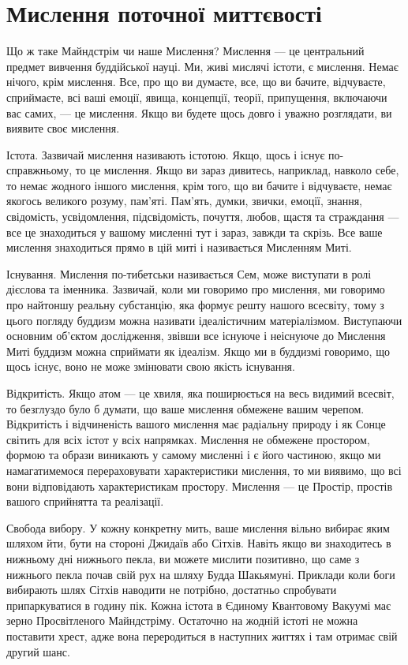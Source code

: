 \section{Мислення поточної миттєвості}

Що ж таке Майндстрім чи наше Мислення? Мислення --- це центральний предмет
вивчення буддійської науці. Ми, живі мислячі істоти, є мислення. Немає нічого,
крім мислення. Все, про що ви думаєте, все, що ви бачите, відчуваєте, сприймаєте,
всі ваші емоції, явища, концепції, теорії, припущення, включаючи вас самих, --- це мислення.
Якщо ви будете щось довго і уважно розглядати, ви виявите своє мислення.

Істота. Зазвичай мислення називають істотою. Якщо, щось і існує по-справжньому, то це мислення.
Якщо ви зараз дивитесь, наприклад, навколо себе, то немає жодного іншого мислення,
крім того, що ви бачите і відчуваєте, немає якогось великого розуму, пам'яті.
Пам'ять, думки, звички, емоції, знання, свідомість, усвідомлення, підсвідомість, почуття,
любов, щастя та страждання --- все це знаходиться у вашому мисленні тут і зараз, завжди та скрізь.
Все ваше мислення знаходиться прямо в цій миті і називається Мисленням Миті.

Існування. Мислення по-тибетськи називається Сем, може виступати в ролі дієслова
та іменника. Зазвичай, коли ми говоримо про мислення, ми говоримо про найтоншу
реальну субстанцію, яка формує решту нашого всесвіту, тому з цього погляду буддизм
можна називати ідеалістичним матеріалізмом. Виступаючи основним об'єктом дослідження,
звівши все існуюче і неіснуюче до Мислення Миті буддизм можна сприймати як ідеалізм.
Якщо ми в буддизмі говоримо, що щось існує, воно не може змінювати свою якість існування.

Відкритість. Якщо атом --- це хвиля, яка поширюється на весь видимий всесвіт,
то безглуздо було б думати, що ваше мислення обмежене вашим черепом. Відкритість і відчиненість
вашого мислення має радіальну природу і як Сонце світить для всіх істот у всіх напрямках.
Мислення не обмежене простором, формою та образи виникають у самому мисленні і є його частиною,
якщо ми намагатимемося перераховувати характеристики мислення, то ми виявимо, що всі вони
відповідають характеристикам простору. Мислення --- це Простір, простів вашого сприйнятта та реалізації.

Свобода вибору. У кожну конкретну мить, ваше мислення вільно вибирає яким шляхом йти,
бути на стороні Джидаїв або Сітхів. Навіть якщо ви знаходитесь в нижньому дні
нижнього пекла, ви можете мислити позитивно, що саме з нижнього пекла почав свій рух
на шляху Будда Шакьямуні. Приклади коли боги вибирають шлях Сітхів наводити не потрібно,
достатньо спробувати припаркуватися в годину пік. Кожна істота в Єдиному Квантовому
Вакуумі має зерно Просвітленого Майндстріму. Остаточно на жодній істоті не можна поставити хрест,
адже вона переродиться в наступних життях і там отримає свій другий шанс.


